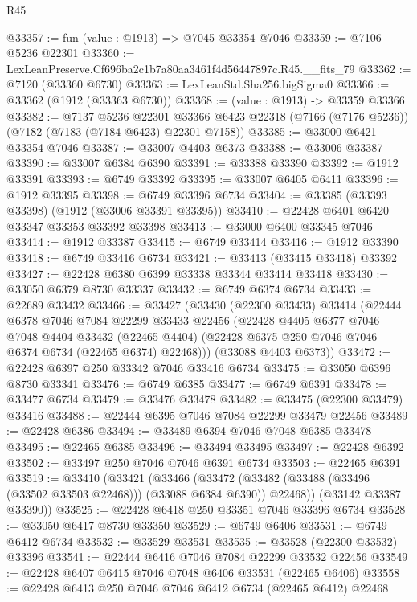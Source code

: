 \begin{lexlean}{R45}
\begin{coremodule}
{@33357 := fun (value : @1913) => @7045 @33354 @7046
@33359 := @7106 @5236 @22301
@33360 := LexLeanPreserve.Cf696ba2c1b7a80aa3461f4d56447897c.R45.__fits_79
@33362 := @7120 (@33360 @6730)
@33363 := LexLeanStd.Sha256.bigSigma0
@33366 := @33362 (@1912 (@33363 @6730))
@33368 := (value : @1913) -> @33359 @33366
@33382 := @7137
    @5236
    @22301
    @33366
    @6423
    @22318
    (@7166 (@7176 @5236))
    (@7182 (@7183 (@7184 @6423) @22301 @7158))
@33385 := @33000 @6421 @33354 @7046
@33387 := @33007 @4403 @6373
@33388 := @33006 @33387
@33390 := @33007 @6384 @6390
@33391 := @33388 @33390
@33392 := @1912 @33391
@33393 := @6749 @33392
@33395 := @33007 @6405 @6411
@33396 := @1912 @33395
@33398 := @6749 @33396 @6734
@33404 := @33385 (@33393 @33398) (@1912 (@33006 @33391 @33395))
@33410 := @22428 @6401 @6420 @33347 @33353 @33392 @33398
@33413 := @33000 @6400 @33345 @7046
@33414 := @1912 @33387
@33415 := @6749 @33414
@33416 := @1912 @33390
@33418 := @6749 @33416 @6734
@33421 := @33413 (@33415 @33418) @33392
@33427 := @22428 @6380 @6399 @33338 @33344 @33414 @33418
@33430 := @33050 @6379 @8730 @33337
@33432 := @6749 @6374 @6734
@33433 := @22689 @33432
@33466 := @33427
    (@33430
      (@22300 @33433)
      @33414
      (@22444
        @6378
        @7046
        @7084
        @22299
        @33433
        @22456
        (@22428
          @4405
          @6377
          @7046
          @7048
          @4404
          @33432
          (@22465 @4404)
          (@22428 @6375 @250 @7046 @7046 @6374 @6734 (@22465 @6374) @22468)))
      (@33088 @4403 @6373))
@33472 := @22428 @6397 @250 @33342 @7046 @33416 @6734
@33475 := @33050 @6396 @8730 @33341
@33476 := @6749 @6385
@33477 := @6749 @6391
@33478 := @33477 @6734
@33479 := @33476 @33478
@33482 := @33475 (@22300 @33479) @33416
@33488 := @22444 @6395 @7046 @7084 @22299 @33479 @22456
@33489 := @22428 @6386
@33494 := @33489 @6394 @7046 @7048 @6385 @33478
@33495 := @22465 @6385
@33496 := @33494 @33495
@33497 := @22428 @6392
@33502 := @33497 @250 @7046 @7046 @6391 @6734
@33503 := @22465 @6391
@33519 := @33410
    (@33421
      (@33466
        (@33472 (@33482 (@33488 (@33496 (@33502 @33503 @22468))) (@33088 @6384 @6390)) @22468))
      (@33142 @33387 @33390))
@33525 := @22428 @6418 @250 @33351 @7046 @33396 @6734
@33528 := @33050 @6417 @8730 @33350
@33529 := @6749 @6406
@33531 := @6749 @6412 @6734
@33532 := @33529 @33531
@33535 := @33528 (@22300 @33532) @33396
@33541 := @22444 @6416 @7046 @7084 @22299 @33532 @22456
@33549 := @22428 @6407 @6415 @7046 @7048 @6406 @33531 (@22465 @6406)
@33558 := @22428 @6413 @250 @7046 @7046 @6412 @6734 (@22465 @6412) @22468
}
\end{coremodule}
\end{lexlean}
